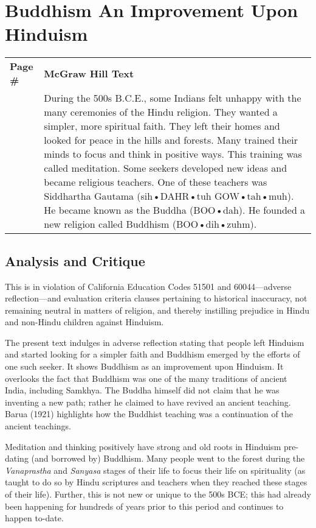 \chapter{Buddhism An Improvement Upon Hinduism}

\begin{longtable}{|>{\raggedleft}p{1.5cm}|p{8.5cm}|}
\multicolumn{2}{c}{\textbf{Table: 1}}\\ 
\hline
\textbf{Page \#} & \textbf{McGraw Hill Text} \tabularnewline
\hline 
264 & During the 500s B.C.E., some Indians felt unhappy with the many ceremonies of the Hindu religion. They wanted a simpler, more spiritual faith. They left their homes and looked for peace in the hills and forests. Many trained their minds to focus and think in positive ways. This training was called meditation. Some seekers developed new ideas and became religious teachers. One of these teachers was Siddhartha Gautama (sih•DAHR•tuh GOW•tah•muh). He became known as the Buddha (BOO•dah). He founded a new religion called Buddhism (BOO•dih•zuhm).\tabularnewline
\hline
\end{longtable}

\section*{Analysis and Critique} 

This is in violation of California Education Codes 51501 and 60044—adverse reflection—and evaluation criteria clauses pertaining to historical inaccuracy, not remaining neutral in matters of religion, and thereby instilling prejudice in Hindu and non-Hindu children against Hinduism.

The present text indulges in adverse reflection stating that people left Hinduism and started looking for a simpler faith and Buddhism emerged by the efforts of one such seeker. It shows Buddhism as an improvement upon Hinduism. It overlooks the fact that Buddhism was one of the many traditions of ancient India, including Samkhya. The Buddha himself did not claim that he was inventing a new path; rather he claimed to have revived an ancient teaching. Barua (1921) highlights how the Buddhist teaching was a continuation of the ancient teachings. 

Meditation and thinking positively have strong and old roots in Hinduism pre-dating (and borrowed by) Buddhism. Many people went to the forest during the \textit{Vanaprastha} and \textit{Sanyasa} stages of their life to focus their life on spirituality (as taught to do so by Hindu scriptures and teachers when they reached these stages of their life). Further, this is not new or unique to the 500s BCE; this had already been happening for hundreds of years prior to this period and continues to happen to-date.

